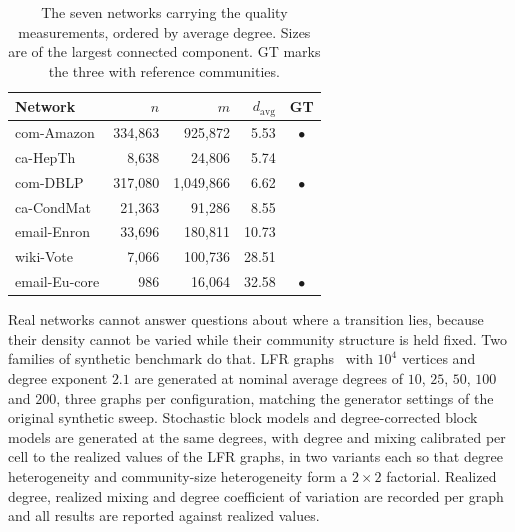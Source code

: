 \begin{table}[t]
\centering
\caption{The seven networks carrying the quality measurements, ordered by average
degree. Sizes are of the largest connected component. GT marks the three with
reference communities.}
\label{tab:networks}
\small
\setlength{\tabcolsep}{5pt}
\begin{tabular}{@{}lrrrc@{}}
\toprule
Network & $n$ & $m$ & $d_{\mathrm{avg}}$ & GT\\
\midrule
com-Amazon    & 334{,}863 &   925{,}872 &  5.53 & $\bullet$\\
ca-HepTh      &   8{,}638 &    24{,}806 &  5.74 & \\
com-DBLP      & 317{,}080 & 1{,}049{,}866 &  6.62 & $\bullet$\\
ca-CondMat    &  21{,}363 &    91{,}286 &  8.55 & \\
email-Enron   &  33{,}696 &   180{,}811 & 10.73 & \\
wiki-Vote     &   7{,}066 &   100{,}736 & 28.51 & \\
email-Eu-core &      986 &    16{,}064 & 32.58 & $\bullet$\\
\bottomrule
\end{tabular}
\end{table}

Real networks cannot answer questions about where a transition lies, because
their density cannot be varied while their community structure is held fixed. Two
families of synthetic benchmark do that. LFR
graphs~\cite{lancichinetti2008benchmark} with $10^4$ vertices and degree exponent
$2.1$ are generated at nominal average degrees of $10$, $25$, $50$, $100$ and
$200$, three graphs per configuration, matching the generator settings of the
original synthetic sweep. Stochastic block models and degree-corrected block
models are generated at the same degrees, with degree and mixing calibrated per
cell to the realized values of the LFR graphs, in two variants each so that
degree heterogeneity and community-size heterogeneity form a $2 \times 2$
factorial. Realized degree, realized mixing and degree coefficient of variation
are recorded per graph and all results are reported against realized values.

